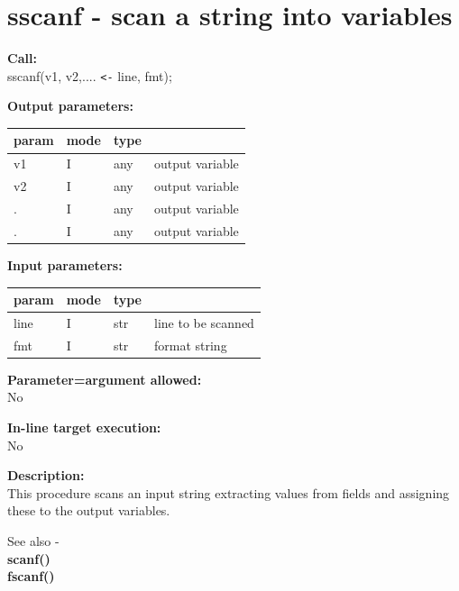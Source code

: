     \section{sscanf - scan a string into variables}\label{sec:ipsscanf}

        {\bf Call:} \\
        sscanf(v1, v2,.... \verb'<-' line, fmt);
        
        {\bf Output parameters:} \\
        \begin{tabular}{| l | l | l | l |}
        \hline
        param  & mode     & type  & \\
        \hline \hline
        v1 & I & any & output variable  \\ \hline
        v2 & I & any & output variable  \\ \hline
        .  & I & any & output variable  \\ \hline
        .  & I & any & output variable  \\ \hline
        \end{tabular}
        
        {\bf Input parameters:} \\
        \begin{tabular}{| l | l | l | l |}
        \hline
        param  & mode     & type  & \\
        \hline \hline
        line & I & str & line to be scanned \\ \hline
        fmt  & I & str & format string      \\ \hline
        \end{tabular}
        
        {\bf Parameter=argument allowed:} \\
        No
        
        {\bf In-line target execution:} \\
        No
        
        {\bf Description:} \\
        This procedure scans an input string extracting values from fields
        and assigning these to the output variables.
        
        
       
        See also - \\
        {\bf scanf()}  \\
        {\bf fscanf()}  \\






